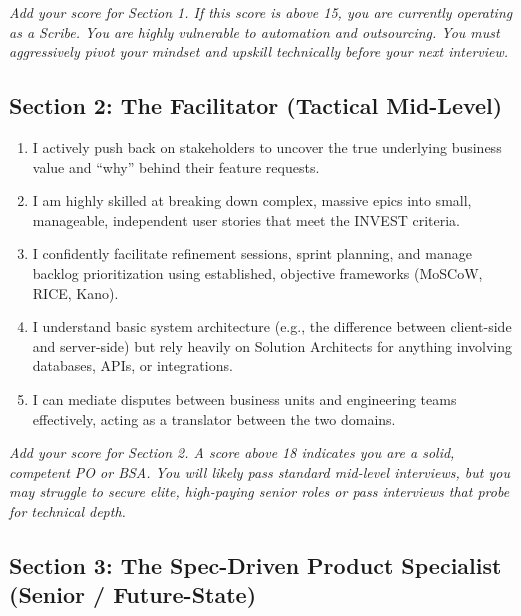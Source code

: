 \documentclass[
  11pt,
  openany,
  oneside]{book}
\providecommand{\tightlist}{%
  \setlength{\itemsep}{0pt}\setlength{\parskip}{0pt}}
\begin{document}
\emph{Add your score for Section 1. If this score is above 15, you are
currently operating as a Scribe. You are highly vulnerable to automation
and outsourcing. You must aggressively pivot your mindset and upskill
technically before your next interview.}

\subsection{Section 2: The Facilitator (Tactical
Mid-Level)}\label{section-2-the-facilitator-tactical-mid-level}

\begin{enumerate}
\def\labelenumi{\arabic{enumi}.}
\tightlist
\item
  I actively push back on stakeholders to uncover the true underlying
  business value and ``why'' behind their feature requests.
\item
  I am highly skilled at breaking down complex, massive epics into
  small, manageable, independent user stories that meet the INVEST
  criteria.
\item
  I confidently facilitate refinement sessions, sprint planning, and
  manage backlog prioritization using established, objective frameworks
  (MoSCoW, RICE, Kano).
\item
  I understand basic system architecture (e.g., the difference between
  client-side and server-side) but rely heavily on Solution Architects
  for anything involving databases, APIs, or integrations.
\item
  I can mediate disputes between business units and engineering teams
  effectively, acting as a translator between the two domains.
\end{enumerate}

\emph{Add your score for Section 2. A score above 18 indicates you are a
solid, competent PO or BSA. You will likely pass standard mid-level
interviews, but you may struggle to secure elite, high-paying senior
roles or pass interviews that probe for technical depth.}

\subsection{Section 3: The Spec-Driven Product Specialist (Senior /
Future-State)}\label{section-3-the-spec-driven-product-specialist-senior-future-state}
\end{document}
